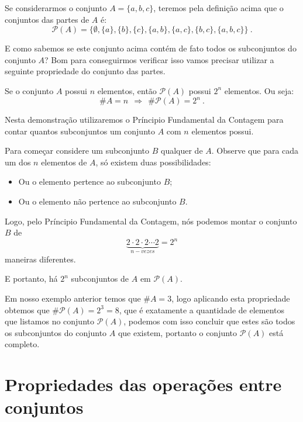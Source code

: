  \begin{exem}
 Se considerarmos o conjunto $A= \{a, b, c\}$, teremos pela definição acima que o conjuntos das partes de $A$ é:
 \[\mathcal{P}(A)= \{ \emptyset, \{a\}, \{b\}, \{c\}, \{a, b\}, \{a, c\}, \{b, c\}, \{a, b, c\} \} \ .\]
 \end{exem}

 E como sabemos se este conjunto acima contém de fato todos os subconjuntos do conjunto $A$? Bom para conseguirmos verificar isso vamos precisar utilizar a seguinte propriedade do conjunto das partes.

 \begin{prop}
  Se o conjunto $A$ possui $n$ elementos, então $\mathcal{P}(A)$ possui $2^n$ elementos. Ou seja:
  \[\# A= n \ \ \Rightarrow \ \ \# \mathcal{P}(A)= 2^n \ .\]
\end{prop}

 \begin{dem}
 Nesta demonstração utilizaremos o Príncipio Fundamental da Contagem para contar quantos subconjuntos um conjunto $A$ com $n$ elementos possui.

 Para começar considere um subconjunto $B$ qualquer de $A$. Observe que para cada um dos $n$ elementos de $A$, só existem duas possibilidades:
 \begin{itemize}
 \item Ou o elemento pertence ao subconjunto $B$;
 \item Ou o elemento não pertence ao subconjunto $B$.
 \end{itemize}

 Logo, pelo Príncipio Fundamental da Contagem, nós podemos montar o conjunto $B$ de
 \[\underbrace{2 \cdot 2 \cdot 2 \cdots 2}_{n-vezes}= 2^n\]
 maneiras diferentes.

 E portanto, há $2^n$ subconjuntos de $A$ em $\mathcal{P}(A)$.
 \end{dem}

 Em nosso exemplo anterior temos que $\# A= 3$, logo aplicando esta propriedade obtemos que $\# \mathcal{P}(A)= 2^3= 8$, que é exatamente a quantidade de elementos que listamos no conjunto $\mathcal{P}(A)$, podemos com isso concluir que estes são todos os subconjuntos do conjunto $A$ que existem, portanto o conjunto $\mathcal{P}(A)$ está completo.



 \newpage
 \section{Propriedades das operações entre conjuntos}

